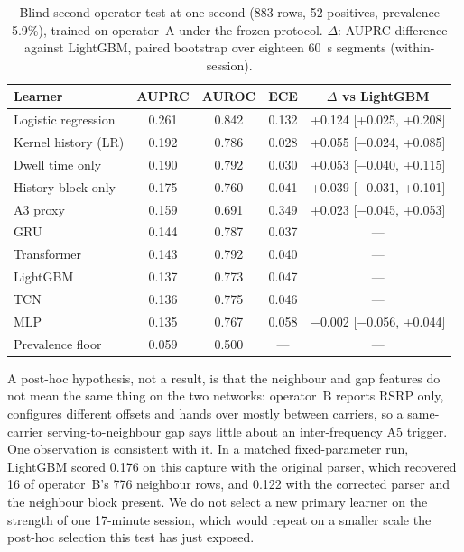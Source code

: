 \documentclass[5p,times,twocolumn]{elsarticle}
\begin{document}
\begin{table}[t]
\centering
\caption{Blind second-operator test at one second (883 rows, 52 positives, prevalence 5.9\%), trained on operator~A under the frozen protocol. $\Delta$: AUPRC difference against LightGBM, paired bootstrap over eighteen 60~s segments (within-session).}
\label{tab:blind}
\footnotesize
\setlength{\tabcolsep}{2.5pt}
\begin{tabularx}{\linewidth}{X c c c c}
\toprule
\textbf{Learner} & \textbf{AUPRC} & \textbf{AUROC} & \textbf{ECE} & \textbf{$\Delta$ vs LightGBM} \\
\midrule
Logistic regression & 0.261 & 0.842 & 0.132 & +0.124 [+0.025, +0.208] \\
Kernel history (LR) & 0.192 & 0.786 & 0.028 & +0.055 [$-$0.024, +0.085] \\
Dwell time only & 0.190 & 0.792 & 0.030 & +0.053 [$-$0.040, +0.115] \\
History block only & 0.175 & 0.760 & 0.041 & +0.039 [$-$0.031, +0.101] \\
A3 proxy & 0.159 & 0.691 & 0.349 & +0.023 [$-$0.045, +0.053] \\
GRU & 0.144 & 0.787 & 0.037 & --- \\
Transformer & 0.143 & 0.792 & 0.040 & --- \\
LightGBM & 0.137 & 0.773 & 0.047 & --- \\
TCN & 0.136 & 0.775 & 0.046 & --- \\
MLP & 0.135 & 0.767 & 0.058 & $-$0.002 [$-$0.056, +0.044] \\
Prevalence floor & 0.059 & 0.500 & --- & --- \\
\bottomrule
\end{tabularx}
\end{table}

A post-hoc hypothesis, not a result, is that the neighbour and gap features do not mean the same thing on the two networks: operator~B reports RSRP only, configures different offsets and hands over mostly between carriers, so a same-carrier serving-to-neighbour gap says little about an inter-frequency A5 trigger. One observation is consistent with it. In a matched fixed-parameter run, LightGBM scored 0.176 on this capture with the original parser, which recovered 16 of operator~B's 776 neighbour rows, and 0.122 with the corrected parser and the neighbour block present. We do not select a new primary learner on the strength of one 17-minute session, which would repeat on a smaller scale the post-hoc selection this test has just exposed.
\end{document}
